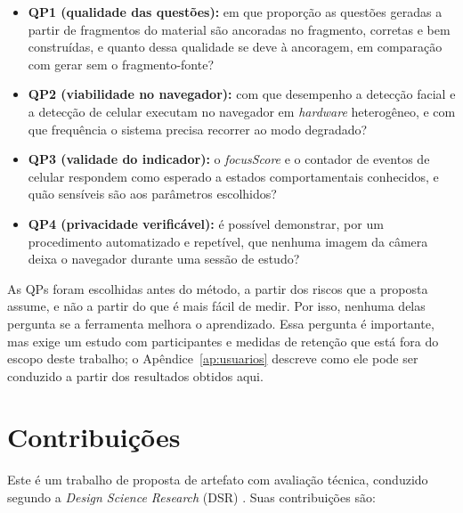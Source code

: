 \documentclass[portuguese,oneside]{tcc}
\newcommand{\estr}[1]{\emph{#1}}
\newcommand{\fs}{\emph{focusScore}\xspace}
\begin{document}
\begin{itemize}
  \item \textbf{QP1 (qualidade das questões):} em que proporção as questões geradas a partir de fragmentos do material são ancoradas no fragmento, corretas e bem construídas, e quanto dessa qualidade se deve à ancoragem, em comparação com gerar sem o fragmento-fonte?
  \item \textbf{QP2 (viabilidade no navegador):} com que desempenho a detecção facial e a detecção de celular executam no navegador em \estr{hardware} heterogêneo, e com que frequência o sistema precisa recorrer ao modo degradado?
  \item \textbf{QP3 (validade do indicador):} o \fs e o contador de eventos de celular respondem como esperado a estados comportamentais conhecidos, e quão sensíveis são aos parâmetros escolhidos?
  \item \textbf{QP4 (privacidade verificável):} é possível demonstrar, por um procedimento automatizado e repetível, que nenhuma imagem da câmera deixa o navegador durante uma sessão de estudo?
\end{itemize}

As QPs foram escolhidas antes do método, a partir dos riscos que a proposta assume, e não a partir do que é mais fácil de medir. Por isso, nenhuma delas pergunta se a ferramenta melhora o aprendizado. Essa pergunta é importante, mas exige um estudo com participantes e medidas de retenção que está fora do escopo deste trabalho; o Apêndice~\ref{ap:usuarios} descreve como ele pode ser conduzido a partir dos resultados obtidos aqui.

\section{Contribuições}

Este é um trabalho de proposta de artefato com avaliação técnica, conduzido segundo a \estr{Design Science Research} (DSR) \cite{HMPR04}. Suas contribuições são:
\end{document}

